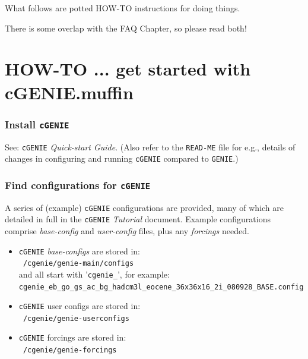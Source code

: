 \documentclass[11pt,fleqn]{book} %
\begin{document}
\hfill \break
\vspace{24mm}

\Large
What follows are potted HOW-TO instructions for doing things.
\vspace{2mm}

There is some overlap with the FAQ Chapter, so please read both!
\normalsize


\newpage


\section{HOW-TO ... get started with cGENIE.muffin}\label{how-to-0}
\vspace{2mm}

%
\subsubsection{Install \texttt{cGENIE}}\label{Install cGENIE}

\vspace{1mm}
See: \texttt{cGENIE} \textit{Quick-start Guide}. (Also refer to the \texttt{READ-ME} file for e.g., details of changes in configuring and running \texttt{cGENIE} compared to \texttt{GENIE}.)

%
\subsubsection{Find configurations for \texttt{cGENIE}}\label{Find configurations for cGENIE}

\vspace{1mm}
A series of (example) \texttt{cGENIE} configurations are provided, many of which are detailed in full in the \texttt{cGENIE} \textit{Tutorial} document.
Example configurations comprise \textit{base-config} and \textit{user-config} files, plus any \textit{forcings} needed.
\begin{itemize}[noitemsep]
\item\texttt{cGENIE} \textit{base-configs} are stored in:
\\ \texttt{~/cgenie/genie-main/configs}
\\and all start with '\texttt{cgenie\_}', for example: \\ \texttt{cgenie\_eb\_go\_gs\_ac\_bg\_hadcm3l\_eocene\_36x36x16\_2i\_080928\_BASE.config}
\item \texttt{cGENIE} user configs are stored in:
\\ \texttt{~/cgenie/genie-userconfigs}
\item \texttt{cGENIE} forcings are stored in:
\\ \texttt{~/cgenie/genie-forcings}
\end{itemize}
\end{document}
